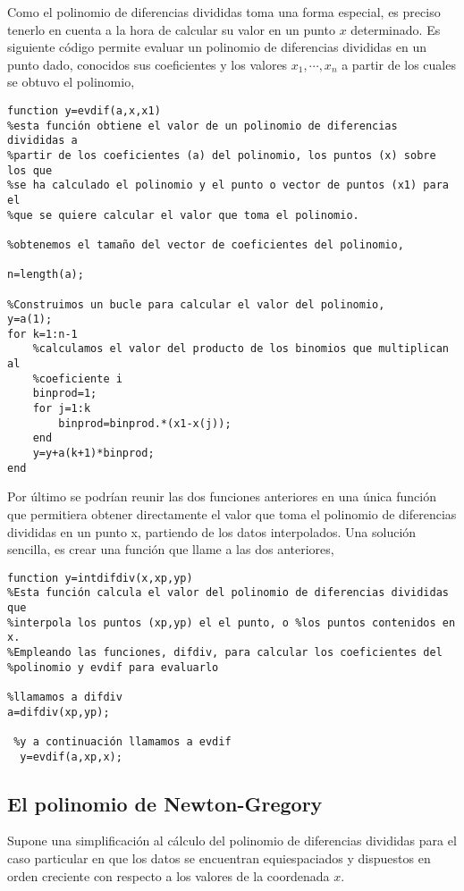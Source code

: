 Como el polinomio de diferencias divididas toma una forma especial, es preciso tenerlo en cuenta a la hora de calcular su valor en un punto $x$ determinado. Es siguiente código permite evaluar un polinomio de diferencias divididas en un punto dado, conocidos sus coeficientes y los valores $x_1,\cdots, x_n$ a partir de los cuales se obtuvo el polinomio,

\begin{verbatim}
function y=evdif(a,x,x1)
%esta función obtiene el valor de un polinomio de diferencias divididas a
%partir de los coeficientes (a) del polinomio, los puntos (x) sobre los que
%se ha calculado el polinomio y el punto o vector de puntos (x1) para el
%que se quiere calcular el valor que toma el polinomio.

%obtenemos el tamaño del vector de coeficientes del polinomio,

n=length(a);

%Construimos un bucle para calcular el valor del polinomio,
y=a(1);
for k=1:n-1
    %calculamos el valor del producto de los binomios que multiplican al
    %coeficiente i
    binprod=1;
    for j=1:k
        binprod=binprod.*(x1-x(j));
    end
    y=y+a(k+1)*binprod;
end
\end{verbatim}

Por último se podrían reunir las dos funciones anteriores en una única función que permitiera obtener directamente el valor que toma el polinomio de diferencias divididas en un punto x, partiendo de los datos interpolados. Una solución sencilla, es crear una función que llame a las dos anteriores,

\begin{verbatim}
function y=intdifdiv(x,xp,yp)
%Esta función calcula el valor del polinomio de diferencias divididas que 
%interpola los puntos (xp,yp) el el punto, o %los puntos contenidos en x. 
%Empleando las funciones, difdiv, para calcular los coeficientes del
%polinomio y evdif para evaluarlo

%llamamos a difdiv
a=difdiv(xp,yp);
 
 %y a continuación llamamos a evdif
  y=evdif(a,xp,x);
 \end{verbatim} 
 
 \subsection{El polinomio de Newton-Gregory} \label{sec:newgre}  
 Supone una simplificación al cálculo del polinomio de diferencias divididas para el caso particular en que los datos se encuentran equiespaciados y dispuestos en orden creciente con respecto a los valores de la coordenada $x$.
 
